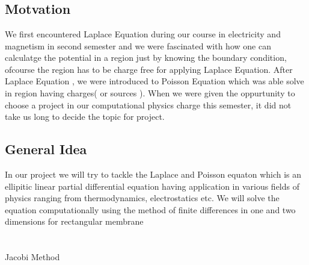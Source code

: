 \documentclass[letterpaper,11pt]{article}
\newcommand{\newsection}[1]{\section{\sffamily{\bfseries{#1}}}}
\begin{document}
	\newsection {Introduction}
		\subsection{Motvation}
		\noindent 
		We first encountered Laplace Equation during our course in electricity and magnetism in second semester and we were fascinated with how one can calculatge the potential in a region just by knowing the boundary condition, ofcourse the region has to be charge free for applying Laplace Equation. After Laplace Equation , we were introduced to Poisson Equation which was able solve in region having charges( or sources ). When we were given the oppurtunity to choose a project in our computational physics charge this semester, it did not take us long to decide the topic for project.
		\subsection{General Idea}
		\noindent
		In our project we will try to tackle the Laplace and Poisson equaton which is an ellipitic linear partial differential equation having application in various fields of physics ranging from thermodynamics, electrostatics etc. We will solve the equation computationally using the method of finite differences in one and two dimensions for rectangular membrane
	
	\newpage
	\newsection{Algprithm}
\begin{algorithm}
	\caption{Jacobi Method}
\end{algorithm}
\end{document}
